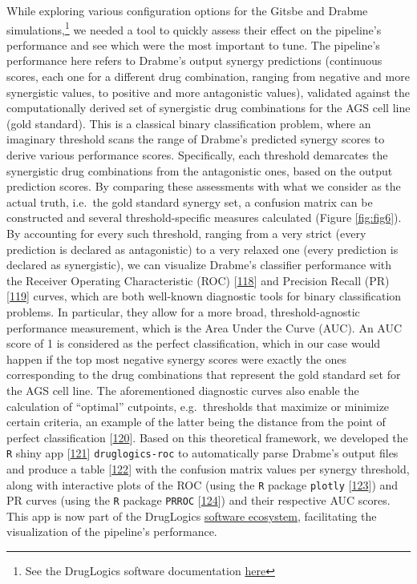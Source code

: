\documentclass[
  12pt,
]{book}
\begin{document}
While exploring various configuration options for the Gitsbe and Drabme simulations,\footnote{See the DrugLogics software documentation \protect\hyperlink{doc-links}{here}} we needed a tool to quickly assess their effect on the pipeline's performance and see which were the most important to tune.
The pipeline's performance here refers to Drabme's output synergy predictions (continuous scores, each one for a different drug combination, ranging from negative and more synergistic values, to positive and more antagonistic values), validated against the computationally derived set of synergistic drug combinations for the AGS cell line (gold standard).
This is a classical binary classification problem, where an imaginary threshold scans the range of Drabme's predicted synergy scores to derive various performance scores.
Specifically, each threshold demarcates the synergistic drug combinations from the antagonistic ones, based on the output prediction scores.
By comparing these assessments with what we consider as the actual truth, i.e.~the gold standard synergy set, a confusion matrix can be constructed and several threshold-specific measures calculated (Figure \ref{fig:fig6}).
By accounting for every such threshold, ranging from a very strict (every prediction is declared as antagonistic) to a very relaxed one (every prediction is declared as synergistic), we can visualize Drabme's classifier performance with the Receiver Operating Characteristic (ROC) {[}\protect\hyperlink{ref-Fawcett2006}{118}{]} and Precision Recall (PR) {[}\protect\hyperlink{ref-Saito2015}{119}{]} curves, which are both well-known diagnostic tools for binary classification problems.
In particular, they allow for a more broad, threshold-agnostic performance measurement, which is the Area Under the Curve (AUC).
An AUC score of 1 is considered as the perfect classification, which in our case would happen if the top most negative synergy scores were exactly the ones corresponding to the drug combinations that represent the gold standard set for the AGS cell line.
The aforementioned diagnostic curves also enable the calculation of ``optimal'' cutpoints, e.g.~thresholds that maximize or minimize certain criteria, an example of the latter being the distance from the point of perfect classification {[}\protect\hyperlink{ref-Perkins2006}{120}{]}.
Based on this theoretical framework, we developed the \texttt{R} shiny app {[}\protect\hyperlink{ref-Chang2021}{121}{]} \texttt{druglogics-roc} to automatically parse Drabme's output files and produce a table {[}\protect\hyperlink{ref-Xie2021}{122}{]} with the confusion matrix values per synergy threshold, along with interactive plots of the ROC (using the \texttt{R} package \texttt{plotly} {[}\protect\hyperlink{ref-Sievert2020}{123}{]}) and PR curves (using the \texttt{R} package \texttt{PRROC} {[}\protect\hyperlink{ref-Grau2015}{124}{]}) and their respective AUC scores.
This app is now part of the DrugLogics \protect\hyperlink{druglogics-soft-links}{software ecosystem}, facilitating the visualization of the pipeline's performance.
\end{document}
